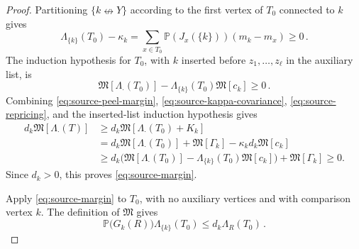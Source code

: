 \documentclass[11pt]{article}
\theoremstyle{definition}
\theoremstyle{remark}
\newcommand{\PP}{\mathbb P}
\newcommand{\ncon}{\nleftrightarrow}
\newcommand{\Marg}{\mathfrak M}
\begin{document}
\begin{proof}
Partitioning $\{k\ncon Y\}$ according to the first vertex of $T_0$ connected to $k$ gives
\begin{equation}\label{eq:source-repricing}
 \Lambda_{\{k\}}(T_0)-\kappa_k
 =\sum_{x\in T_0}\PP(J_x(\{k\}))(m_k-m_x)\geq0\,.
\end{equation}
The induction hypothesis for $T_0$, with $k$ inserted before
$z_1,\ldots,z_\ell$ in the auxiliary list, is
\[
 \Marg[\Lambda_\cdot(T_0)]
 -\Lambda_{\{k\}}(T_0)\Marg[c_k]\geq0\,.
\]
Combining \eqref{eq:source-peel-margin}, \eqref{eq:source-kappa-covariance},
\eqref{eq:source-repricing}, and the inserted-list induction hypothesis gives
\[
\begin{aligned}
 d_k\Marg[\Lambda_\cdot(T)]
 &\geq d_k\Marg[\Lambda_\cdot(T_0)+K_k]\\
 &=d_k\Marg[\Lambda_\cdot(T_0)]
   +\Marg[\Gamma_k]-\kappa_kd_k\Marg[c_k]\\
 &\geq d_k\bigl(\Marg[\Lambda_\cdot(T_0)]
   -\Lambda_{\{k\}}(T_0)\Marg[c_k]\bigr)
   +\Marg[\Gamma_k]\geq0.
\end{aligned}
\]
Since $d_k>0$, this proves \eqref{eq:source-margin}.

Apply \eqref{eq:source-margin} to $T_0$, with no auxiliary vertices and with comparison
vertex $k$. The definition of $\Marg$ gives
\begin{equation}\label{eq:pairtransfer}
 \PP\bigl(G_k(R)\bigr)\Lambda_{\{k\}}(T_0)
 \leq d_k\Lambda_R(T_0)\,.
\end{equation}


\end{proof}
\end{document}

